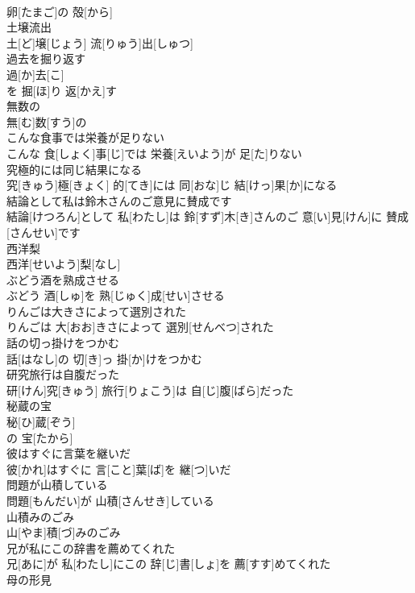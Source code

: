 \documentclass[8pt]{extreport}
\begin{document}
\begin{CJK}{UTF8}{min}
\\	卵[たまご]の 殻[から]
\\	土壌流出	
\\	土[ど]壌[じょう] 流[りゅう]出[しゅつ]
\\	過去を掘り返す	
\\	過[か]去[こ] 
\\	を 掘[ほ]り 返[かえ]す 
\\	無数の	
\\	無[む]数[すう]の
\\	こんな食事では栄養が足りない	
\\	こんな 食[しょく]事[じ]では 栄養[えいよう]が 足[た]りない
\\	究極的には同じ結果になる	
\\	究[きゅう]極[きょく] 的[てき]には 同[おな]じ 結[けっ]果[か]になる
\\	結論として私は鈴木さんのご意見に賛成です	
\\	結論[けつろん]として 私[わたし]は 鈴[すず]木[き]さんのご 意[い]見[けん]に 賛成[さんせい]です
\\	西洋梨	
\\	西洋[せいよう]梨[なし]
\\	ぶどう酒を熟成させる	
\\	ぶどう 酒[しゅ]を 熟[じゅく]成[せい]させる
\\	りんごは大きさによって選別された	
\\	りんごは 大[おお]きさによって 選別[せんべつ]された
\\	話の切っ掛けをつかむ	
\\	話[はなし]の 切[き]っ 掛[か]けをつかむ
\\	研究旅行は自腹だった	
\\	研[けん]究[きゅう] 旅行[りょこう]は 自[じ]腹[ばら]だった
\\	秘蔵の宝	
\\	秘[ひ]蔵[ぞう]
\\	の 宝[たから]
\\	彼はすぐに言葉を継いだ	
\\	彼[かれ]はすぐに 言[こと]葉[ば]を 継[つ]いだ
\\	問題が山積している	
\\	問題[もんだい]が 山積[さんせき]している
\\	山積みのごみ	
\\	山[やま]積[づ]みのごみ
\\	兄が私にこの辞書を薦めてくれた	
\\	兄[あに]が 私[わたし]にこの 辞[じ]書[しょ]を 薦[すす]めてくれた
\\	母の形見	

\end{CJK}
\end{document}
